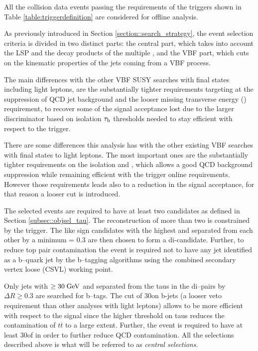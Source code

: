 All the collision data events passing the requirements of the triggers shown in Table \ref{table:triggerdefinition} are considered for offline analysis. 

As previously introduced in Section \ref{section::search_strategy}, the event selection criteria is divided in two distinct parts: the central part, which takes into account the LSP and the decay products of the multiple \hadtau, and the VBF part, which cuts on the kinematic properties of the jets coming from a VBF process. 

The main differences with the other VBF SUSY searches with final states including light leptons, are the substantially tighter \hadtau requirements targeting at the suppression of QCD jet background and the looser missing transverse energy (\met) requirement, to recover some of the signal acceptance lost due to the larger discriminator based on isolation $\tau_{\text{h}}$ \pt thresholds needed to stay efficient with respect to the trigger. 

There are some differences this analysis has with the other existing VBF searches with final states to light leptons. The most important ones are the substantially tighter requirements on the \hadtau isolation and \pt, which allows a good QCD background suppression while remaining efficient with the trigger online requirements. However those requirements leads also to a reduction in the signal acceptance, for that reason a looser \met cut is introduced.

The selected events are required to have at least two \hadtau candidates as defined in Section \ref{subsec::objsel_tau}. The reconstruction of more than two \hadtau is constrained by the trigger. The like sign \hadtau candidates with the highest \pt and separated from each other by a minimum \deltar = 0.3 are then chosen to form a di-\hadtau candidate. 
Further, to reduce top pair contamination the event is required not to have any jet identified as a b--quark jet by the b--tagging algorithms using the {\textit combined secondary vertex loose} (CSVL) working point. 

Only jets with \pt $\ge 30\;\text{Ge}\kern-0.06667em\text{V}$ and separated from the taus in the di--\hadtau pairs by $\Delta R \ge 0.3$ are searched for b--tags. The \pt cut of 30\gev on b-jets (a looser veto requirement than other analyses with light leptons) allows to be more efficient with respect to the signal since the higher \pt threshold on taus reduces the contamination of $t\overline{t}$ to a large extent. Further, the event is required to have at least 30\gev of \met in order to further reduce QCD contamination. All the selections described above is what will be referred to as \textit{central selections}.

